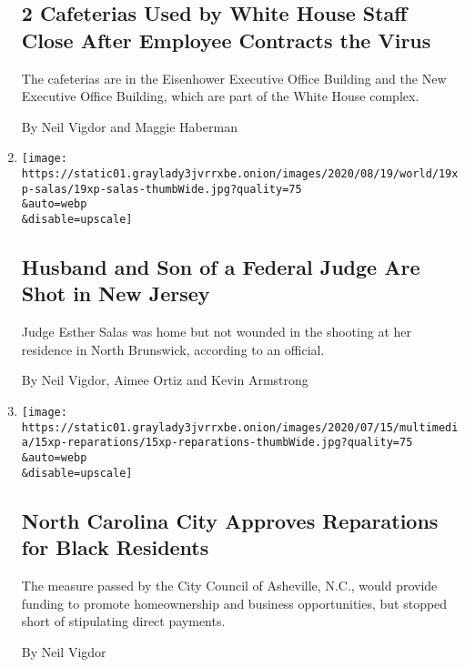 \begin{enumerate}
{  \subsection{2 Cafeterias Used by White House Staff Close After
  Employee Contracts the
  Virus}\label{2-cafeterias-used-by-white-house-staff-close-after-employee-contracts-the-virus}}

  The cafeterias are in the Eisenhower Executive Office Building and the
  New Executive Office Building, which are part of the White House
  complex.

  By Neil Vigdor and Maggie Haberman
\item
  \href{/2020/07/19/nyregion/shooting-nj-judge-esther-salas.html}{}

  \texttt{[image: https://static01.graylady3jvrrxbe.onion/images/2020/08/19/world/19xp-salas/19xp-salas-thumbWide.jpg?quality=75\\\&auto=webp\\\&disable=upscale]}

  \hypertarget{husband-and-son-of-a-federal-judge-are-shot-in-new-jersey}{%
  \subsection{Husband and Son of a Federal Judge Are Shot in New
  Jersey}\label{husband-and-son-of-a-federal-judge-are-shot-in-new-jersey}}

  Judge Esther Salas was home but not wounded in the shooting at her
  residence in North Brunswick, according to an official.

  By Neil Vigdor, Aimee Ortiz and Kevin Armstrong
\item
  \href{/2020/07/16/us/reparations-asheville-nc.html}{}

  \texttt{[image: https://static01.graylady3jvrrxbe.onion/images/2020/07/15/multimedia/15xp-reparations/15xp-reparations-thumbWide.jpg?quality=75\\\&auto=webp\\\&disable=upscale]}

  \hypertarget{north-carolina-city-approves-reparations-for-black-residents}{%
  \subsection{North Carolina City Approves Reparations for Black
  Residents}\label{north-carolina-city-approves-reparations-for-black-residents}}

  The measure passed by the City Council of Asheville, N.C., would
  provide funding to promote homeownership and business opportunities,
  but stopped short of stipulating direct payments.

  By Neil Vigdor
\end{enumerate}

